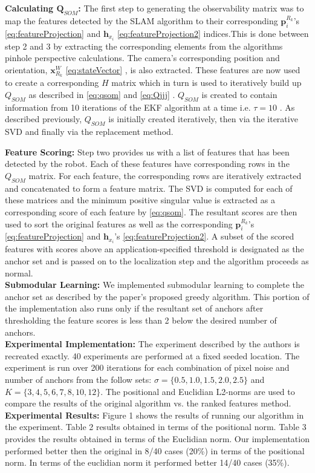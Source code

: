 \documentclass[10pt,twocolumn,letterpaper]{article}
\begin{document}
\textbf{Calculating $\boldsymbol{Q}_{SOM}$:} The first step to generating the observability matrix was to map the features detected by the SLAM algorithm to their corresponding $\boldsymbol{p}_{i}^{R_k}$'s \eqref{eq:featureProjection} and $\boldsymbol{h}_{x_i}$ \eqref{eq:featureProjection2} indices.This is done between step 2 and 3 by extracting the corresponding elements from the algorithms pinhole perspective calculations. The camera's corresponding position and orientation, $\boldsymbol{x}_{R_k}^W$ \eqref{eq:stateVector} , is also extracted. These features are now used to create a corresponding $H$ matrix which in turn is used to iteratively build up $Q_{SOM}$ as described in \eqref{eq:qsom} and \eqref{eq:Qjjj} . $Q_{SOM}$ is created to contain information from 10 iterations of the EKF algorithm at a time i.e. $\tau = 10$ . As described previously, $Q_{SOM}$ is initially created iteratively, then via the iterative SVD and finally via the replacement method.
  
\textbf{Feature Scoring:} Step two provides us with a list of features that has been detected by the robot. Each of these features have corresponding rows in the $Q_{SOM}$ matrix. For each feature, the corresponding rows are iteratively extracted and concatenated to form a feature matrix. 
The SVD is computed for each of these matrices and the minimum positive singular value is extracted as a
 corresponding score of each feature by \eqref{eq:qsom}. 
 The resultant scores are then used to sort the original features as well 
as the corresponding $\boldsymbol{p}_{i}^{R_k}$'s \eqref{eq:featureProjection} and $\boldsymbol{h}_{x_i}$'s 
\eqref{eq:featureProjection2}. A subset of the scored features with scores above an 
application-specified threshold is designated as the anchor set and is passed on to the localization step and the algorithm proceeds as normal.\\
\indent{}\textbf{Submodular Learning:} We implemented submodular learning to complete the anchor set as described by the paper's proposed greedy algorithm. This portion of the implementation also runs only if the resultant set of anchors after thresholding the feature scores is less than 2 below the desired number of 
anchors.\\
\indent{}\textbf{Experimental Implementation:} The experiment described by the authors is recreated exactly. 40 experiments are performed at a fixed seeded location. The experiment is run over 200 iterations for each combination of pixel noise and number of anchors from the follow sets: $\sigma=\{0.5, 1.0, 1.5, 2.0, 2.5\} $ and $ K = \{ 3, 4, 5, 6, 7, 8, 10, 12 \}$. The positional and Euclidian L2-norms are used to compare the results of the original algorithm vs. the ranked features method.\\
\indent{}\textbf{Experimental Results:} Figure 1 shows the results of running our algorithm in the experiment. Table 2 results obtained in terms of the positional norm. 
Table 3 provides the results obtained in terms of the Euclidian norm. 
Our implementation performed better then the original in 8/40 cases (20\%) in terms of the positional norm. 
In terms of the euclidian norm it performed better 14/40 cases (35\%).
\end{document}
